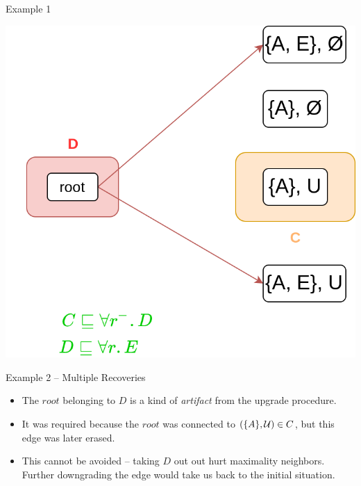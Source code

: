 \documentclass[10pt]{beamer}
\begin{document}
\begin{frame}[fragile]{Example 1}
  \begin{center}
  \includegraphics[scale=.3]{img/ex1_3.png}
  \end{center}
\end{frame}

\begin{frame}[fragile]{Example 2 -- Multiple Recoveries}
  \begin{itemize}
    \item The $root$ belonging to $D$ is a kind of \emph{artifact} from the upgrade procedure.
    \item It was required because the $root$ was connected to $(\{A\}, \mathcal{U}) \in C$, but this edge was later erased.
    \item This cannot be avoided -- taking $D$ out out hurt maximality \wrt neighbors. Further downgrading the edge would take us back to the initial situation.
  \end{itemize}
\end{frame}
\end{document}
